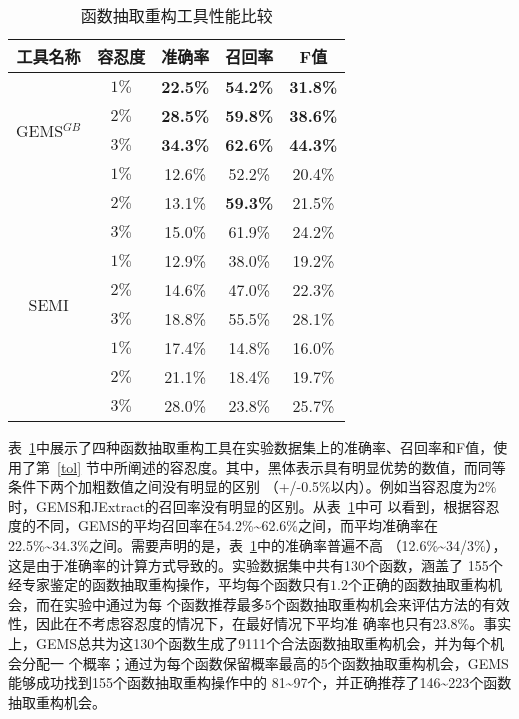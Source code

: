 \begin{table}[!t]
  \scriptsize
  \renewcommand{\arraystretch}{1.3}
  \caption{函数抽取重构工具性能比较}
  \label{accuracy}
  \centering
  \begin{tabular}{cc|ccc}
  \toprule
   工具名称 &容忍度 &准确率 &召回率 &F值\\ 
  \hline
  \multirow{4}{*}{GEMS$^{GB}$}&$1\%$ &\bf{22.5\%} &\bf{54.2\%} &\bf{31.8\%} \\ 
  &$2\%$ &\bf{28.5\%} &\bf{59.8\%} &\bf{38.6\%} \\ 
  &$3\%$ &\bf{34.3\%} &\bf{62.6\%} &\bf{44.3\%} \\ 
  \hline
  \multirow{4}{*}{JExtract}&$1\%$ &12.6\% &52.2\% &20.4\% \\ 
  &$2\%$ &13.1\% &\bf{59.3\%} &21.5\% \\ 
  &$3\%$ &15.0\% &61.9\% &24.2\% \\ 
  \hline
  \multirow{4}{*}{SEMI}&$1\%$ &12.9\% &38.0\% &19.2\% \\ 
  &$2\%$ &14.6\% &47.0\% &22.3\% \\ 
  &$3\%$ &18.8\% &55.5\% &28.1\% \\ 
  \hline
  \multirow{4}{*}{JDeodorant}&$1\%$ &17.4\% &14.8\% &16.0\% \\
  &$2\%$ &21.1\% &18.4\% &19.7\% \\ 
  &$3\%$ &28.0\% &23.8\% &25.7\% \\ 
  \bottomrule
  \end{tabular}
  \end{table}

表~\ref{accuracy}中展示了四种函数抽取重构工具在实验数据集上的准确率、召回率和F值，使用了第~\ref{tol}
节中所阐述的容忍度。其中，黑体表示具有明显优势的数值，而同等条件下两个加粗数值之间没有明显的区别
（+/-0.5\%以内）。例如当容忍度为2\%时，GEMS和JExtract的召回率没有明显的区别。从表~\ref{accuracy}中可
以看到，根据容忍度的不同，GEMS的平均召回率在54.2\%\textasciitilde62.6\%之间，而平均准确率在
22.5\%\textasciitilde 34.3\%之间。需要声明的是，表~\ref{accuracy}中的准确率普遍不高
（12.6\%\textasciitilde34/3\%），这是由于准确率的计算方式导致的。实验数据集中共有130个函数，涵盖了
155个经专家鉴定的函数抽取重构操作，平均每个函数只有$1.2$个正确的函数抽取重构机会，而在实验中通过为每
个函数推荐最多5个函数抽取重构机会来评估方法的有效性，因此在不考虑容忍度的情况下，在最好情况下平均准
确率也只有23.8\%。事实上，GEMS总共为这130个函数生成了9111个合法函数抽取重构机会，并为每个机会分配一
个概率；通过为每个函数保留概率最高的5个函数抽取重构机会，GEMS能够成功找到155个函数抽取重构操作中的
81\textasciitilde97个，并正确推荐了146\textasciitilde223个函数抽取重构机会。

